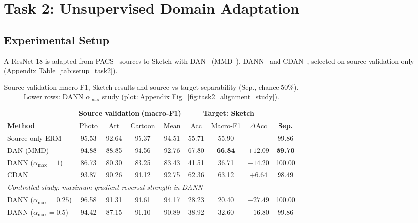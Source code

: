 \section{Task 2: Unsupervised Domain Adaptation}

\subsection{Experimental Setup}
A ResNet-18 is adapted from PACS~\citep{li2017pacs} sources to Sketch with DAN~\citep{long2015dan} (MMD~\citep{gretton2012kernel}), DANN~\citep{ganin2016dann} and CDAN~\citep{long2018cdan}, selected on source validation only (Appendix Table~\ref{tab:setup_task2}).

\begin{table}[htbp]
  \caption{Source validation macro-F1, Sketch results and source-vs-target separability (Sep., chance 50\%). Lower rows: DANN $\alpha_{\max}$ study (plot: Appendix Fig.~\ref{fig:task2_alignment_study}).}
  \label{tab:task2_methods}
  \centering
  \small
  \setlength{\tabcolsep}{5pt}
  \begin{tabular}{lcccccccc}
    \toprule
    & \multicolumn{4}{c}{\textbf{Source validation (macro-F1)}} & \multicolumn{3}{c}{\textbf{Target: Sketch}} & \\
    \cmidrule(lr){2-5} \cmidrule(lr){6-8}
    \textbf{Method} & Photo & Art & Cartoon & Mean & Acc & Macro-F1 & $\Delta$Acc & \textbf{Sep.} \\
    \midrule
    Source-only ERM         & 95.53 & 92.64 & 95.37 & 94.51 & 55.71 & 55.90 & ---      & 99.86 \\
    DAN (MMD)               & 94.88 & 88.85 & 94.56 & 92.76 & 67.80 & \textbf{66.84} & $+12.09$ & \textbf{89.70} \\
    DANN ($\alpha_{\max}=1$) & 86.73 & 80.30 & 83.25 & 83.43 & 41.51 & 36.71 & $-14.20$ & 100.00 \\
    CDAN                    & 93.87 & 90.26 & 94.12 & 92.75 & 62.36 & 63.12 & $+6.64$  & 98.49 \\
    \midrule
    \multicolumn{9}{l}{\textit{Controlled study: maximum gradient-reversal strength in DANN}} \\
    DANN ($\alpha_{\max}=0.25$) & 96.58 & 91.31 & 94.61 & 94.17 & 28.23 & 20.40 & $-27.49$ & 100.00 \\
    DANN ($\alpha_{\max}=0.5$)  & 94.42 & 87.15 & 91.10 & 90.89 & 38.92 & 32.60 & $-16.80$ & 99.86 \\
    \bottomrule
  \end{tabular}
\end{table}

